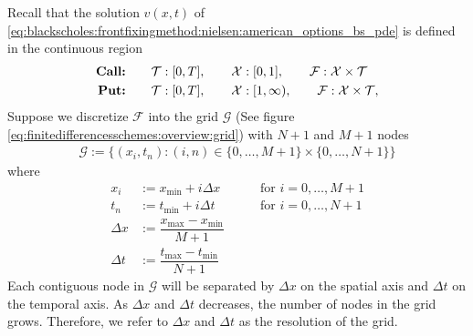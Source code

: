 Recall that the solution $v(x,t)$ of 
\eqref{eq:blackscholes:frontfixingmethod:nielsen:american_options_bs_pde} is defined in the continuous region 
\begin{subequations}
  \label{eq:finitedifferencesschemes:overview:continous_domain}
\begin{align}
  \text{\textbf{Call:}} \qquad& \mathcal{T}: [0, T], \qquad \mathcal{X}: [0, 1], \qquad  \mathcal{F}: \mathcal{X} \times \mathcal{T} \\
  \text{\textbf{Put:}} \qquad& \mathcal{T}:[0, T], \qquad \mathcal{X}:[1, \infty), \qquad \mathcal{F}: \mathcal{X} \times \mathcal{T},
\end{align}
\end{subequations}
Suppose we discretize $\mathcal{F}$ into the grid $\mathcal{G}$ (See figure \ref{eq:finitedifferencesschemes:overview:grid}) with $N+1$ and $M+1$ nodes
\begin{align}
  \label{eq:finitedifferencesschemes:overview:grid}
  \mathcal{G} := \{(x_i, t_n): (i, n) \in \{0,\dots,M+1\}\times\{0,\dots,N+1\}\}
\end{align}
where
\begin{align}
  \label{eq:finitedifferencesschemes:overview:grid_2}
  x_i &:= x_{\text{min}} + i\Delta x &  \qquad \text{for $i = 0,\dots, M+1$} \\
  t_n &:= t_{\text{min}} + i{\Delta t} & \qquad \text{for $i = 0,\dots, N+1$} \\
  \Delta{x} &:= \dfrac{x_{\text{max}} - x_{\text{min}}}{M+1} \\ 
  \Delta{t} &:= \dfrac{t_{\text{max}} - t_{\text{min}}}{N+1}
\end{align}
Each contiguous node in $\mathcal{G}$ will be separated by $\Delta{x}$ on the spatial axis and $\Delta{t}$ on the temporal axis. As $\Delta{x}$ and $\Delta{t}$ decreases, the number of nodes in the grid grows. Therefore, we refer to $\Delta{x}$ and $\Delta{t}$ as the resolution of the grid.
